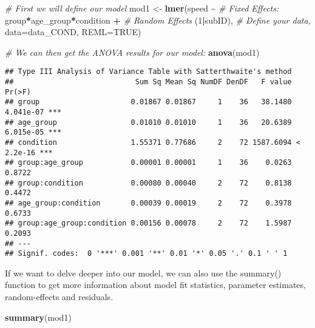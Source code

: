 \documentclass[]{article}
\newenvironment{Shaded}{\begin{snugshade}}{\end{snugshade}}
\newcommand{\CommentTok}[1]{\textcolor[rgb]{0.56,0.35,0.01}{\textit{#1}}}
\newcommand{\DataTypeTok}[1]{\textcolor[rgb]{0.13,0.29,0.53}{#1}}
\newcommand{\DecValTok}[1]{\textcolor[rgb]{0.00,0.00,0.81}{#1}}
\newcommand{\KeywordTok}[1]{\textcolor[rgb]{0.13,0.29,0.53}{\textbf{#1}}}
\newcommand{\NormalTok}[1]{#1}
\newcommand{\OperatorTok}[1]{\textcolor[rgb]{0.81,0.36,0.00}{\textbf{#1}}}
\newcommand{\OtherTok}[1]{\textcolor[rgb]{0.56,0.35,0.01}{#1}}
\newcommand{\StringTok}[1]{\textcolor[rgb]{0.31,0.60,0.02}{#1}}
\begin{document}
\begin{Shaded}
\begin{Highlighting}[]
\CommentTok{\# First we will define our model}
\NormalTok{mod1 <{-}}\StringTok{ }\KeywordTok{lmer}\NormalTok{(speed }\OperatorTok{\textasciitilde{}}\StringTok{ }
\StringTok{               }\CommentTok{\# Fixed Effects:}
\StringTok{               }\NormalTok{group}\OperatorTok{*}\NormalTok{age\_group}\OperatorTok{*}\NormalTok{condition }\OperatorTok{+}\StringTok{ }
\StringTok{               }\CommentTok{\# Random Effects}
\StringTok{               }\NormalTok{(}\DecValTok{1}\OperatorTok{|}\NormalTok{subID), }
               \CommentTok{\# Define your data, }
             \DataTypeTok{data=}\NormalTok{data\_COND, }\DataTypeTok{REML=}\OtherTok{TRUE}\NormalTok{)}

\CommentTok{\# We can then get the ANOVA results for our model:}
\KeywordTok{anova}\NormalTok{(mod1)}
\end{Highlighting}
\end{Shaded}

\begin{verbatim}
## Type III Analysis of Variance Table with Satterthwaite's method
##                            Sum Sq Mean Sq NumDF DenDF   F value    Pr(>F)    
## group                     0.01867 0.01867     1    36   38.1480 4.041e-07 ***
## age_group                 0.01010 0.01010     1    36   20.6389 6.015e-05 ***
## condition                 1.55371 0.77686     2    72 1587.6094 < 2.2e-16 ***
## group:age_group           0.00001 0.00001     1    36    0.0263    0.8722    
## group:condition           0.00080 0.00040     2    72    0.8138    0.4472    
## age_group:condition       0.00039 0.00019     2    72    0.3978    0.6733    
## group:age_group:condition 0.00156 0.00078     2    72    1.5987    0.2093    
## ---
## Signif. codes:  0 '***' 0.001 '**' 0.01 '*' 0.05 '.' 0.1 ' ' 1
\end{verbatim}

If we want to delve deeper into our model, we can also use the summary()
function to get more information about model fit statistics, parameter
estimates, random-effects and residuals.

\begin{Shaded}
\begin{Highlighting}[]
\KeywordTok{summary}\NormalTok{(mod1)}
\end{Highlighting}
\end{Shaded}
\end{document}

